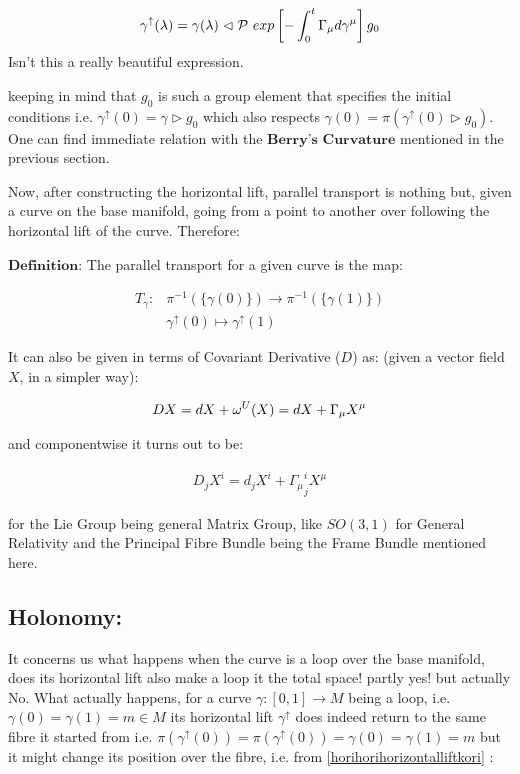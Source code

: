 \documentclass[8pt, twocoloumn]{article}
\begin{document}
\begin{align} {\label{horihorihorizontalliftkori}}
    \gamma^{\uparrow}(\lambda) = \gamma(\lambda) \vartriangleleft \mathcal{P} \ exp \left[ - \int_{0}^{t} \Gamma_{\mu} d\gamma^{\mu}\right] g_0
\end{align}
Isn't this a really beautiful expression. 

keeping in mind  that $g_0$ is such a group element that specifies the initial conditions i.e. $\gamma^{\uparrow}(0)  = \gamma \vartriangleright g_0$ which  also respects $\gamma(0) = \pi(\gamma^{\uparrow}(0) \vartriangleright g_0)$. One can find immediate relation with the $\textbf{Berry's Curvature}$ mentioned in the previous section. 

Now, after constructing the horizontal lift, parallel transport is nothing but, given a curve on the base manifold, going from a point to another over following the horizontal lift of the curve. Therefore:

$\textbf{Definition:}$ The parallel transport for a given curve is the map:

\begin{align}
    T_{\gamma}:& \pi^{-1}(\{ \gamma(0)\}) \to \pi^{-1}(\{ \gamma(1)\}) \\
    & \gamma^{\uparrow}(0) \mapsto \gamma^{\uparrow}(1)
\end{align}

It can also be given in terms of Covariant Derivative ($D$) as: (given a vector field $X$, in a simpler way):

\begin{align}{\label{covariantderivative}}
DX = dX + \omega^U(X) = dX + \Gamma_{\mu}X^{\mu}
\end{align}

and componentwise it turns out to be: 

\begin{align}
    D_jX^i = d_jX^i + {\Gamma_{\mu}}^i_jX^{\mu}
\end{align}

for the Lie Group being general Matrix Group, like $SO(3,1)$ for General Relativity and the Principal Fibre Bundle being the Frame Bundle mentioned here.

\subsection{Holonomy:}
It concerns us what happens when the curve is a loop over the base manifold, does its horizontal lift also make a loop it the total space! partly yes! but actually No. What actually happens, for a curve $\gamma:[0,1] \to M$ being a loop, i.e. $\gamma(0) = \gamma(1) = m \in M$ its horizontal lift $\gamma^{\uparrow}$ does indeed return to the same fibre it started from i.e. $\pi(\gamma^{\uparrow}(0)) = \pi(\gamma^{\uparrow}(0)) = \gamma(0) = \gamma(1) = m $ but it might change its position over the fibre, i.e. from \ref{horihorihorizontalliftkori} :
\end{document}
